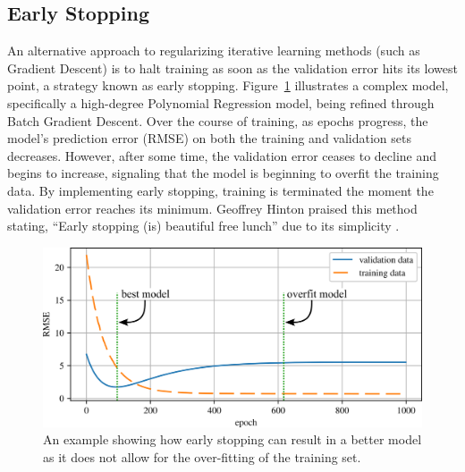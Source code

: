 \documentclass[12pt,letter]{article}
\begin{document}
%
%
%
%
%

\subsection{Early Stopping}

An alternative approach to regularizing iterative learning methods 
(such as Gradient Descent) is to halt training as soon as the validation error hits its lowest point, a strategy known as early stopping. Figure~\ref{fig:early_stopping} illustrates a complex model, specifically a high-degree Polynomial Regression model, being refined through Batch Gradient Descent. Over the course of training, as epochs progress, the model's prediction error (RMSE) on both the training and validation sets decreases. However, after some time, the validation error ceases to decline and begins to increase, signaling that the model is beginning to overfit the training data. By implementing early stopping, training is terminated the moment the validation error reaches its minimum. Geoffrey Hinton praised this method stating, ``Early stopping (is) beautiful free lunch'' due to its simplicity \protect\footnotemark[1].



		\begin{figure}[H]
			\centering
			\includegraphics[width=6in]{../figures/early_stopping.png}
			\caption{An example showing how early stopping can result in a better model as it does not allow for the over-fitting of the training set.}
			\label{fig:early_stopping}
		\end{figure}
\end{document}
